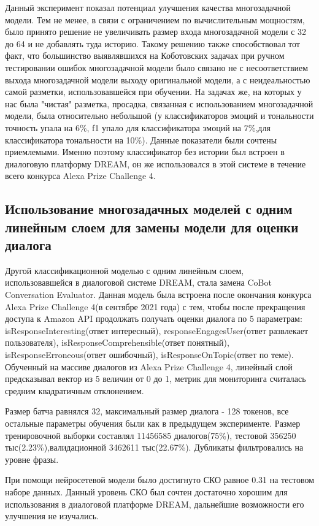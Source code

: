Данный эксперимент показал потенциал улучшения качества многозадачной модели. Тем не менее, в связи с ограничением по вычислительным мощностям, было принято решение не увеличивать размер входа многозадачной модели с 32 до 64 и не добавлять туда историю. Такому решению также способствовал тот факт, что большинство выявлявшихся на Коботовских задачах при ручном тестировании ошибок многозадачной модели  было связано не с несоответствием выхода многозадачной модели выходу оригинальной модели, а с неидеальностью самой разметки, использовавшейся при обучении. 
На задачах же, на которых у нас была "чистая" разметка, просадка, связанная с использованием многозадачной модели, была относительно небольшой (у классификаторов эмоций и тональности точность упала на 6\%, f1 упало для классификатора эмоций на 7\%,для классификатора тональности на 10\%). Данные показатели были сочтены приемлемыми. Именно поэтому классификатор без истории был встроен в диалоговую платформу DREAM, он же использовался в этой системе в течение всего конкурса Alexa Prize Challenge 4.

\subsection{Использование многозадачных моделей с одним линейным слоем для замены модели для оценки диалога}
Другой классификационной моделью с одним линейным слоем, использовавшейся в диалоговой системе DREAM, стала замена CoBot Conversation Evaluator. Данная модель была встроена после окончания конкурса Alexa Prize Challenge 4(в сентябре 2021 года) с тем, чтобы после прекращения доступа к Amazon API продолжать получать оценки диалога по 5 параметрам: isResponseInteresting(ответ интересный), responseEngagesUser(ответ развлекает пользователя), isResponseComprehensible(ответ понятный), isResponseErroneous(ответ ошибочный), isResponseOnTopic(ответ по теме). Обученный на массиве диалогов из Alexa Prize Challenge 4, линейный слой предсказывал вектор из 5 величин от 0 до 1, метрик для мониторинга считалась средним квадратичным отклонением. 

Размер батча равнялся 32, максимальный размер диалога - 128 токенов, все остальные параметры обучения были как в предыдущем эксперименте. Размер тренировочной выборки составлял 11456585 диалогов(75\%), тестовой 356250 тыс(2.23\%),валидационной 3462611 тыс(22.67\%).  Дубликаты фильтровались на уровне фразы.

При помощи нейросетевой модели было достигнуто СКО равное 0.31 на тестовом наборе данных. Данный уровень СКО был сочтен достаточно хорошим для использования в диалоговой платформе DREAM, дальнейшие возможности его улучшения не изучались.


